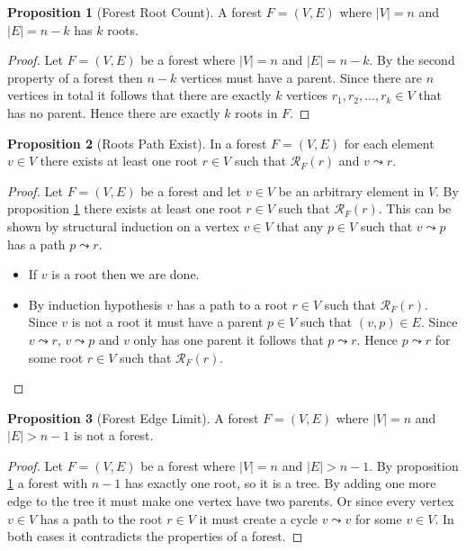 \documentclass[a4paper,12pt]{article}
\theoremstyle{definition}
\newtheorem{proposition}{Proposition}[section]
\begin{document}
\begin{proposition}[Forest Root Count]\label{prop:forest-root-count}
    A forest $F = (V, E)$ where $|V| = n$ and $|E| = n - k$ has $k$ roots.
\end{proposition}

\begin{proof}
    Let $F = (V, E)$ be a forest where $|V| = n$ and $|E| = n - k$. By the
    second property of a forest then $n - k$ vertices must have a parent. Since
    there are $n$ vertices in total it follows that there are exactly $k$
    vertices $r_1, r_2, \ldots, r_k \in V$ that has no parent. Hence there are
    exactly $k$ roots in $F$.
\end{proof}

\begin{proposition}[Roots Path Exist]\label{prop:roots-path-exist}
    In a forest $F = (V, E)$ for each element $v \in V$ there exists at least
    one root $r \in V$ such that $\mathcal{R}_F(r)$ and $v \leadsto r$.
\end{proposition}

\begin{proof}
    Let $F = (V, E)$ be a forest and let $v \in V$ be an arbitrary element in
    $V$. By proposition \ref{prop:forest-root-count} there exists at least one
    root $r \in V$ such that $\mathcal{R}_F(r)$. This can be shown by structural
    induction on a vertex $v \in V$ that any $p \in V$ such that $v \leadsto p$
    has a path $p \leadsto r$.
    \begin{itemize}
        \item If $v$ is a root then we are done.
        \item By induction hypothesis $v$ has a path to a root $r \in V$ such
        that $\mathcal{R}_F(r)$. Since $v$ is not a root it must have a parent
        $p \in V$ such that $(v, p) \in E$. Since $v \leadsto r$, $v \leadsto p$
        and $v$ only has one parent it follows that $p \leadsto r$. Hence $p
        \leadsto r$ for some root $r \in V$ such that $\mathcal{R}_F(r)$.
    \end{itemize}
\end{proof}

\begin{proposition}[Forest Edge Limit]\label{prop:forest-edge-limit}
    A forest $F = (V, E)$ where $|V| = n$ and $|E| > n - 1$ is not a forest.
\end{proposition}

\begin{proof}
    Let $F = (V, E)$ be a forest where $|V| = n$ and $|E| > n - 1$. By
    proposition \ref{prop:forest-root-count} a forest with $n - 1$ has exactly
    one root, so it is a tree. By adding one more edge to the tree it must make
    one vertex have two parents. Or since every vertex $v \in V$ has a path to
    the root $r \in V$ it must create a cycle $v \leadsto v$ for some $v \in V$.
    In both cases it contradicts the properties of a forest.
\end{proof}
\end{document}
